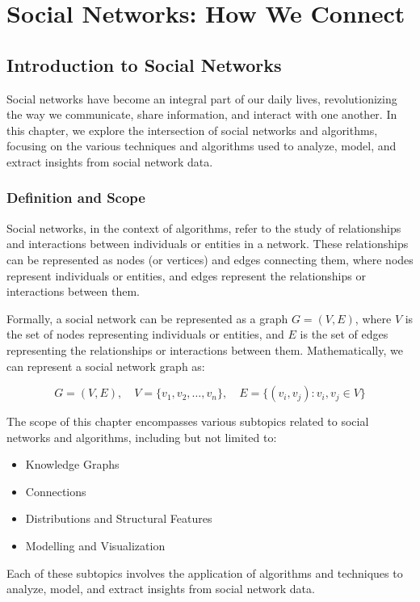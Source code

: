 \documentclass[12pt]{book} %
\begin{document}
\chapter{Social Networks: How We Connect}

\section{Introduction to Social Networks}

Social networks have become an integral part of our daily lives, revolutionizing the way we communicate, share information, and interact with one another. In this chapter, we explore the intersection of social networks and algorithms, focusing on the various techniques and algorithms used to analyze, model, and extract insights from social network data.

\subsection{Definition and Scope}

Social networks, in the context of algorithms, refer to the study of relationships and interactions between individuals or entities in a network. These relationships can be represented as nodes (or vertices) and edges connecting them, where nodes represent individuals or entities, and edges represent the relationships or interactions between them.

Formally, a social network can be represented as a graph \(G = (V, E)\), where \(V\) is the set of nodes representing individuals or entities, and \(E\) is the set of edges representing the relationships or interactions between them. Mathematically, we can represent a social network graph as:

\[
G = (V, E), \quad V = \{v_1, v_2, \ldots, v_n\}, \quad E = \{(v_i, v_j) : v_i, v_j \in V\}
\]

The scope of this chapter encompasses various subtopics related to social networks and algorithms, including but not limited to:

\begin{itemize}
    \item Knowledge Graphs
    \item Connections
    \item Distributions and Structural Features
    \item Modelling and Visualization
\end{itemize}

Each of these subtopics involves the application of algorithms and techniques to analyze, model, and extract insights from social network data.
\end{document}
